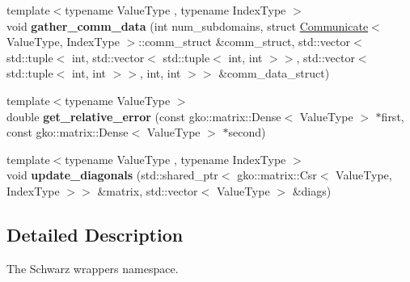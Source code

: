 \begin{DoxyCompactItemize}
\item 
\mbox{\label{namespaceschwz_aa123f4d2e7d96621d22e76cd97784701}} 
{\footnotesize template$<$typename Value\+Type , typename Index\+Type $>$ }\\void {\bfseries gather\+\_\+comm\+\_\+data} (int num\+\_\+subdomains, struct \hyperlink{classschwz_1_1Communicate}{Communicate}$<$ Value\+Type, Index\+Type $>$\+::comm\+\_\+struct \&comm\+\_\+struct, std\+::vector$<$ std\+::tuple$<$ int, std\+::vector$<$ std\+::tuple$<$ int, int $>$$>$, std\+::vector$<$ std\+::tuple$<$ int, int $>$$>$, int, int $>$$>$ \&comm\+\_\+data\+\_\+struct)
\item 
\mbox{\label{namespaceschwz_a326d36155d6eeccd87f66fdf5200df29}} 
{\footnotesize template$<$typename Value\+Type $>$ }\\double {\bfseries get\+\_\+relative\+\_\+error} (const gko\+::matrix\+::\+Dense$<$ Value\+Type $>$ $\ast$first, const gko\+::matrix\+::\+Dense$<$ Value\+Type $>$ $\ast$second)
\item 
\mbox{\label{namespaceschwz_aac5839ef31d9d40a6a9c80a8611b6e50}} 
{\footnotesize template$<$typename Value\+Type , typename Index\+Type $>$ }\\void {\bfseries update\+\_\+diagonals} (std\+::shared\+\_\+ptr$<$ gko\+::matrix\+::\+Csr$<$ Value\+Type, Index\+Type $>$$>$ \&matrix, std\+::vector$<$ Value\+Type $>$ \&diags)
\end{DoxyCompactItemize}


\subsection{Detailed Description}
The Schwarz wrappers namespace. 